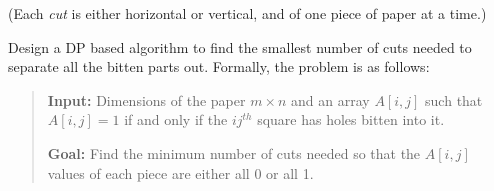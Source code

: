 \documentclass[11pt]{article}
\begin{document}
\vspace{0.4cm}

(Each {\it cut} is either horizontal or vertical, and of
one piece of paper at a time.)

Design a DP based algorithm to find the smallest number of cuts needed to separate all the bitten parts out.
%
Formally, the problem is as follows:

\begin{quote}
\textbf{Input:}  Dimensions of the paper $m \times n$ and an
array $A[i,j]$ such that $A[i,j] = 1$ if and only if the $ij^{th}$
square has holes bitten into it.

\textbf{Goal:} Find the minimum number of cuts needed so that the $A[i, j]$ values of each piece are either all 0 or all 1.
\end{quote}
\end{document}
